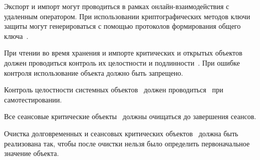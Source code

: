 \begin{note}
Экспорт и импорт могут проводиться в рамках онлайн-взаимодействия с удаленным
оператором. При использовании криптографических методов ключи защиты 
могут генерироваться с помощью протоколов формирования общего 
ключа~.
\end{note}

\label{R.DP.Import} %
При чтении во время хранения и импорте критических и открытых объектов  
должен проводиться контроль их целостности и подлинности~. 
При ошибке контроля использование объекта должно быть запрещено. 

\label{R.DP.System} %
Контроль целостности системных объектов~ 
должен проводиться~ при самотестировании.

\label{R.DP.Session} %
Все сеансовые критические объекты~
должны очищаться до завершения сеансов.

\label{R.DP.Zero} %
Очистка долговременных и сеансовых критических объектов~ 
должна быть реализована так, чтобы после очистки нельзя было определить 
первоначальное значение объекта. 
